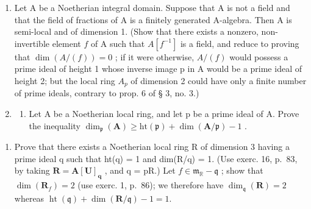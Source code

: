 \begin{enumerate}
\def\labelenumi{\arabic{enumi})}
\setcounter{enumi}{1}
\item
  Let A be a Noetherian integral domain. Suppose that A is not a field and that the field of fractions of A is a finitely generated A-algebra. Then A is semi-local and of dimension 1. (Show that there exists a nonzero, non-invertible element \(f\) of A such that \(A[f^{-1}]\) is a field, and reduce to proving that \(\dim(A/(f)) = 0\) ; if it were otherwise, \(A/(f)\) would possess a prime ideal of height 1 whose inverse image p in A would be a prime ideal of height 2; but the local ring \(A_p\) of dimension 2 could have only a finite number of prime ideals, contrary to prop. 6 of § 3, no. 3.)
\item
  \begin{enumerate}
  \def\labelenumii{\alph{enumii})}
  \tightlist
  \item
    Let A be a Noetherian local ring, and let p be a prime ideal of A. Prove the inequality \(\dim_{\mathfrak{p}}(\mathbf{A}) \geqslant \mathrm{ht}(\mathfrak{p}) + \dim(\mathbf{A}/\mathfrak{p}) - 1\) .
  \end{enumerate}
\end{enumerate}

\begin{enumerate}
\def\labelenumi{\alph{enumi})}
\setcounter{enumi}{1}
\tightlist
\item
  Prove that there exists a Noetherian local ring R of dimension 3 having a prime ideal q such that ht(q) = 1 and dim(R/q) = 1. (Use exerc. 16, p.~83, by taking \(\mathbf{R} = \mathbf{A}[\mathbf{U}]_{\mathbf{q}}\) , and q = pR.) Let \(f \in \mathfrak{m}_{\mathbb{R}} - \mathfrak{q}\) ; show that \(\dim(\mathbf{R}_{f}) = 2\) (use exerc. 1, p.~86); we therefore have \(\dim_{\mathfrak{q}}(\mathbf{R}) = 2\) whereas \(\operatorname{ht}(\mathfrak{q}) + \dim(\mathbf{R}/\mathfrak{q}) - 1 = 1.\)
\end{enumerate}

